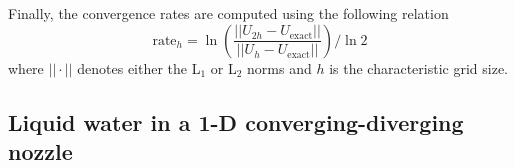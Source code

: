 Finally, the convergence rates are computed using the following relation 
\begin{equation}
\label{eq:conv_rates}
\text{rate}_h = \ln \left( \frac{|| U_{2h}-U_{\text{exact}} ||}{|| U_{h}-U_{\text{exact}}|| } \right) / \ln 2
\end{equation}
where $|| \cdot ||$ denotes either the L$_1$ or L$_2$ norms and $h$ is the characteristic grid size.

\subsection{Liquid water in a 1-D converging-diverging nozzle} \label{sec:liquid_nozzle}

